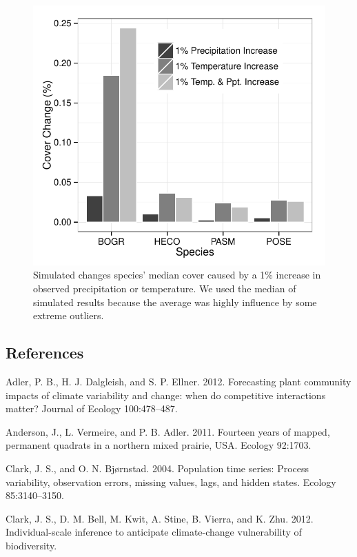 \documentclass[12pt,]{article}
\begin{document}
\begin{figure}[htbp]
\centering
\includegraphics{components/figure/manuscript-figure_2.pdf}
\caption{Simulated changes species' median cover caused by a 1\%
increase in observed precipitation or temperature. We used the median of
simulated results because the average was highly influence by some
extreme outliers.}
\end{figure}

\pagebreak{}

\subsection{References}\label{references}

Adler, P. B., H. J. Dalgleish, and S. P. Ellner. 2012. Forecasting plant
community impacts of climate variability and change: when do competitive
interactions matter? Journal of Ecology 100:478--487.

Anderson, J., L. Vermeire, and P. B. Adler. 2011. Fourteen years of
mapped, permanent quadrats in a northern mixed prairie, USA. Ecology
92:1703.

Clark, J. S., and O. N. Bjørnstad. 2004. Population time series: Process
variability, observation errors, missing values, lags, and hidden
states. Ecology 85:3140--3150.

Clark, J. S., D. M. Bell, M. Kwit, A. Stine, B. Vierra, and K. Zhu.
2012. Individual-scale inference to anticipate climate-change
vulnerability of biodiversity.
\end{document}
